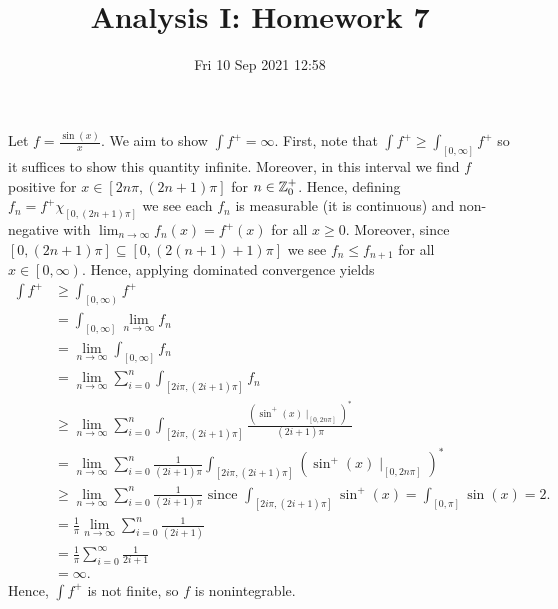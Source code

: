 \documentclass[a4paper]{article}
\title{Analysis I: Homework 7}
\date{Fri 10 Sep 2021 12:58}
\begin{document}
\maketitle
\begin{problem}
Let \(f = \frac{\sin\left( x \right) }{x}\). We aim to show \(\int f^{+} = \infty\). First, note that \(\int f^{+}  \ge \int_{\left[ 0, \infty \right] } f^{+}\) so it suffices to show this quantity infinite. Moreover, in this interval we find \(f\) positive for \(x \in \left[ 2n\pi, (2n+1)\pi \right] \) for \(n \in \mathbb{Z}^{+}_0\). Hence, defining \(f_{n} = f^{+} \chi_{\left[ 0, \left( 2n+1 \right) \pi \right] }\) we see each \(f_{n}\) is measurable (it is continuous) and non-negative with \(\lim_{n \to \infty}f_{n} \left( x \right) = f^{+}\left( x \right) \) for all \(x \ge 0  \). Moreover, since \(\left[ 0, \left( 2n+1 \right) \pi \right] \subseteq \left[ 0, \left( 2\left( n+1 \right) +1 \right) \pi \right] \) we see \(f_{n} \le f_{n+1}\) for all \(x \in \left[ 0, \infty \right) \).  Hence, applying dominated convergence yields
\begin{align*}
	\int f^{+} &\ge \int _{\left[ 0, \infty \right)} f^{+}\\
	&= \int_{\left[ 0, \infty \right] } \lim_{n \to \infty} f_{n} \\
	&= \lim_{n \to \infty} \int_{\left[ 0, \infty \right] } f_{n} \\
	&= \lim_{n \to \infty} \sum_{i=0}^{n} \int_{\left[ 2i\pi, \left( 2i + 1 \right) \pi \right] } f_{n} \\
	&\ge \lim_{n \to \infty} \sum_{i=0}^{n} \int_{\left[ 2i\pi, \left( 2i+1 \right) \pi \right] } \frac{(\sin ^{+}\left( x \right) \mid_{\left[ 0, 2n\pi \right] })^{*} }{\left( 2i + 1 \right) \pi}\\
	&= \lim_{n \to \infty} \sum_{i=0}^{n} \frac{1}{\left( 2i + 1 \right) \pi } \int_{\left[ 2i\pi, \left( 2i+1 \right) \pi \right] } (\sin^{+}\left( x \right) \mid_{\left[ 0, 2n\pi \right] })^{*}\\
	&\ge \lim_{n \to \infty} \sum_{i=0}^{n} \frac{1}{\left( 2i+1 \right) \pi} \text{ since } \int_{\left[ 2i\pi, \left( 2i+1 \right) \pi \right] } \sin ^{+}\left( x \right) = \int_{\left[ 0, \pi \right] } \sin\left( x \right) = 2 .\\
	&= \frac{1}{\pi} \lim_{n \to \infty} \sum_{i=0}^{n} \frac{1}{\left( 2i+1 \right) }\\
	&= \frac{1}{\pi} \sum_{i= 0}^{\infty} \frac{1}{2i+1} \\
	&=  \infty
.\end{align*}
Hence, \(\int f^{+}\) is not finite, so \(f\) is nonintegrable.
\end{problem}
\end{document}
